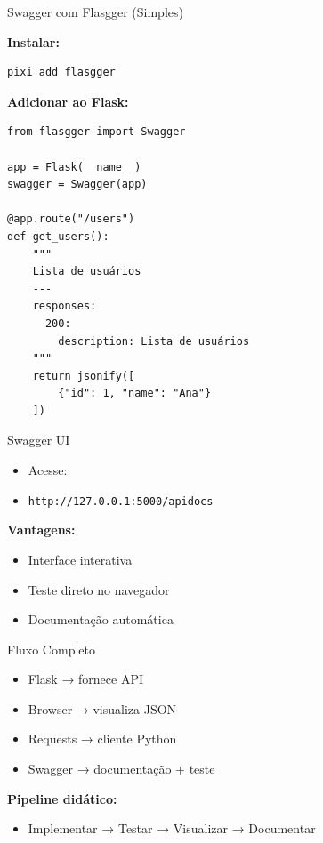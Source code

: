 \documentclass{beamer}
\begin{document}
\begin{frame}[fragile]{Swagger com Flasgger (Simples)}

\textbf{Instalar:}

\begin{verbatim}
pixi add flasgger
\end{verbatim}

\vspace{0.3cm}

\textbf{Adicionar ao Flask:}

\begin{verbatim}
from flasgger import Swagger

app = Flask(__name__)
swagger = Swagger(app)

@app.route("/users")
def get_users():
    """
    Lista de usuários
    ---
    responses:
      200:
        description: Lista de usuários
    """
    return jsonify([
        {"id": 1, "name": "Ana"}
    ])
\end{verbatim}

\end{frame}

\begin{frame}{Swagger UI}

\begin{itemize}
    \item Acesse:
    \item \texttt{http://127.0.0.1:5000/apidocs}
\end{itemize}

\vspace{0.5cm}

\textbf{Vantagens:}
\begin{itemize}
    \item Interface interativa
    \item Teste direto no navegador
    \item Documentação automática
\end{itemize}

\end{frame}

\begin{frame}{Fluxo Completo}

\begin{itemize}
    \item Flask → fornece API
    \item Browser → visualiza JSON
    \item Requests → cliente Python
    \item Swagger → documentação + teste
\end{itemize}

\vspace{0.5cm}

\textbf{Pipeline didático:}

\begin{itemize}
    \item Implementar → Testar → Visualizar → Documentar
\end{itemize}

\end{frame}
\end{document}
